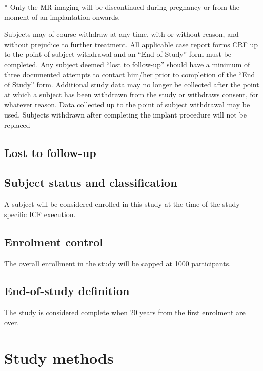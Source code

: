 * Only the MR-imaging will be discontinued during pregnancy or from the moment of an implantation onwards.

Subjects may of course withdraw at any time, with or without reason, and without prejudice to further treatment. All applicable case report forms \ac{CRF} up to the point of subject withdrawal and an ``End of Study'' form must be completed. Any subject deemed ``lost to follow-up'' should have a minimum of three documented attempts to contact him/her prior to completion of the ``End of Study'' form. Additional study data may no longer be collected after the point at which a subject has been withdrawn from the study or withdraws consent, for whatever reason. Data collected up to the point of subject withdrawal may be used. Subjects withdrawn after completing the implant procedure will not be replaced 

\subsection{Lost to follow-up}
\subsection{Subject status and classification}
A subject will be considered enrolled in this study at the time of the study-specific \ac{ICF} execution.

\subsection{Enrolment control}
The overall enrollment in the study will be capped at 1000 participants.

\subsection{End-of-study definition}
The study is considered complete when 20 years from the first enrolment are over.

\section{Study methods}
